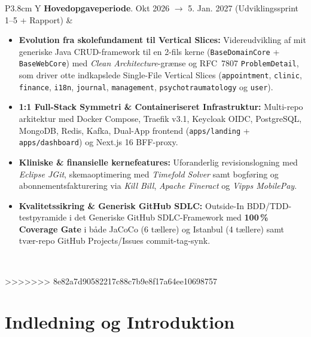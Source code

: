 \documentclass[11pt,a4paper]{article}
\begin{document}
\begin{table}[htbp]
\begin{table}[H]
\centering
\small
\begin{tabularx}{\textwidth}{P{3.8cm} Y}
\toprule
\textbf{Hovedopgaveperiode}. Okt 2026 $\rightarrow$ 5. Jan. 2027
\newline
(Udviklingssprint 1--5 + Rapport) &
\begin{itemize}[leftmargin=*, nosep, topsep=2pt]
    \item \textbf{Evolution fra skolefundament til Vertical Slices:} Videreudvikling af mit generiske Java CRUD-framework til en 2-fils kerne (\texttt{BaseDomainCore} + \texttt{BaseWebCore}) med \textit{Clean Architecture}-grænse og RFC~7807 \texttt{ProblemDetail}, som driver otte indkapslede Single-File Vertical Slices (\texttt{appointment}, \texttt{clinic}, \texttt{finance}, \texttt{i18n}, \texttt{journal}, \texttt{management}, \texttt{psychotraumatology} og \texttt{user}).
    \item \textbf{1:1 Full-Stack Symmetri \& Containeriseret Infrastruktur:} Multi-repo arkitektur med Docker Compose, Traefik v3.1, Keycloak OIDC, PostgreSQL, MongoDB, Redis, Kafka, Dual-App frontend (\texttt{apps/landing} + \texttt{apps/dashboard}) og Next.js 16 BFF-proxy.
    \item \textbf{Kliniske \& finansielle kernefeatures:} Uforanderlig revisionslogning med \textit{Eclipse JGit}, skemaoptimering med \textit{Timefold Solver} samt bogføring og abonnementsfakturering via \textit{Kill Bill}, \textit{Apache Fineract} og \textit{Vipps MobilePay}.
    \item \textbf{Kvalitetssikring \& Generisk GitHub SDLC:} Outside-In BDD/TDD-testpyramide i det Generiske GitHub SDLC-Framework med \textbf{100\,\% Coverage Gate} i både JaCoCo (6 tællere) og Istanbul (4 tællere) samt tvær-repo GitHub Projects/Issues commit-tag-synk.
\end{itemize} \\
\bottomrule
\end{tabularx}
\caption{Fokusområder og konkrete leverancer i hovedopgaveperiodens fem udviklingssprints og rapportskrivning.}
\label{tab:hovedopgaveperiode}
>>>>>>> 8e82a7d90582217c88c7b9e8f17a64ee10698757
\end{table}

\section{Indledning og Introduktion}


\end{table}
\end{document}
